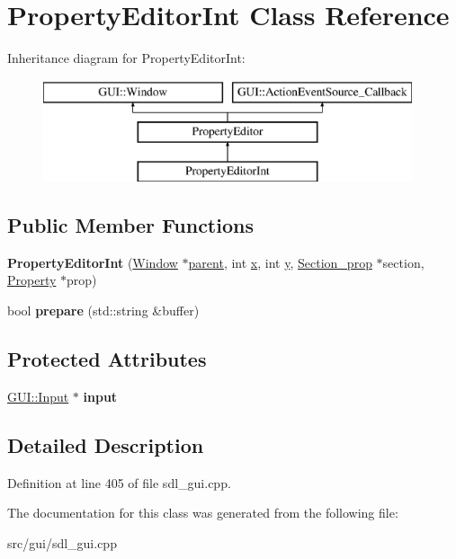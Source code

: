 \hypertarget{classPropertyEditorInt}{\section{Property\-Editor\-Int Class Reference}
\label{classPropertyEditorInt}
}
Inheritance diagram for Property\-Editor\-Int\-:\begin{figure}[H]
\begin{center}
\leavevmode
\includegraphics[height=3.000000cm]{classPropertyEditorInt}
\end{center}
\end{figure}
\subsection*{Public Member Functions}
\begin{DoxyCompactItemize}
\item 
\hypertarget{classPropertyEditorInt_a0f41557774e65f1aa6a57313f3ebf824}{{\bfseries Property\-Editor\-Int} (\hyperlink{classGUI_1_1Window_ae828e9daa964dfc65a3550fb03117d30}{Window} $\ast$\hyperlink{classGUI_1_1Window_a2e593ff65e7702178d82fe9010a0b539}{parent}, int \hyperlink{classGUI_1_1Window_a6ca6a80ca00c9e1d8ceea8d3d99a657d}{x}, int \hyperlink{classGUI_1_1Window_a0ee8e923aff2c3661fc2e17656d37adf}{y}, \hyperlink{classSection__prop}{Section\-\_\-prop} $\ast$section, \hyperlink{classProperty}{Property} $\ast$prop)}\label{classPropertyEditorInt_a0f41557774e65f1aa6a57313f3ebf824}

\item 
\hypertarget{classPropertyEditorInt_a5905c05b04394d9c0f9ee1c332df339e}{bool {\bfseries prepare} (std\-::string \&buffer)}\label{classPropertyEditorInt_a5905c05b04394d9c0f9ee1c332df339e}

\end{DoxyCompactItemize}
\subsection*{Protected Attributes}
\begin{DoxyCompactItemize}
\item 
\hypertarget{classPropertyEditorInt_a9723b1ce18a08a85bbef9edec6b9fa06}{\hyperlink{classGUI_1_1Input}{G\-U\-I\-::\-Input} $\ast$ {\bfseries input}}\label{classPropertyEditorInt_a9723b1ce18a08a85bbef9edec6b9fa06}

\end{DoxyCompactItemize}


\subsection{Detailed Description}


Definition at line 405 of file sdl\-\_\-gui.\-cpp.



The documentation for this class was generated from the following file\-:\begin{DoxyCompactItemize}
\item 
src/gui/sdl\-\_\-gui.\-cpp\end{DoxyCompactItemize}
